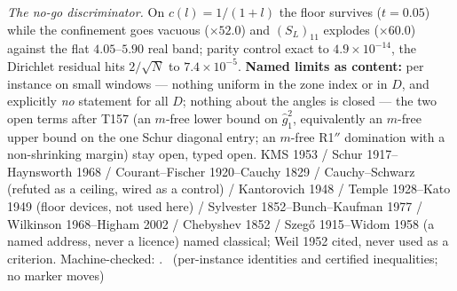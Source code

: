\documentclass[11pt,a4paper]{article}
\theoremstyle{definition}
\begin{document}
\emph{The no-go discriminator.} On $c(l)=1/(1+l)$ the floor survives
($t=0.05$) while the confinement goes vacuous ($\times52.0$) and
$(S_L)_{11}$ explodes ($\times60.0$) against the flat $4.05$--$5.90$
real band; parity control exact to $4.9\times10^{-14}$, the Dirichlet
residual hits $2/\sqrt N$ to $7.4\times10^{-5}$.
\textbf{Named limits as content:} per instance on small windows ---
nothing uniform in the zone index or in $D$, and explicitly \emph{no}
statement for all $D$; nothing about the angles is closed --- the two
open terms after T157 (an $m$-free lower bound on $\hat g_1^2$,
equivalently an $m$-free upper bound on the one Schur diagonal entry;
an $m$-free R1$''$ domination with a non-shrinking margin) stay open,
typed open.
KMS 1953 / Schur 1917--Haynsworth 1968 / Courant--Fischer 1920--Cauchy
1829 / Cauchy--Schwarz (refuted as a ceiling, wired as a control) /
Kantorovich 1948 / Temple 1928--Kato 1949 (floor devices, not used here)
/ Sylvester 1852--Bunch--Kaufman 1977 / Wilkinson 1968--Higham 2002 /
Chebyshev 1852 / Szeg\H{o} 1915--Widom 1958 (a named address, never a
licence) named classical; Weil 1952 cited, never used as a criterion.
Machine-checked:
.
\mE\ (per-instance identities and certified inequalities; no marker moves)
\end{document}
